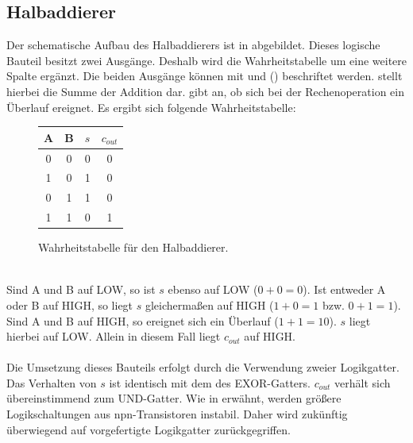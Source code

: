 \subsection{Halbaddierer}
Der schematische Aufbau des Halbaddierers ist in \cite{zimmermann1998binary} abgebildet. Dieses logische Bauteil besitzt zwei Ausgänge. Deshalb wird die Wahrheitstabelle um eine weitere Spalte ergänzt. Die beiden Ausgänge können mit  und  () beschriftet werden.  stellt hierbei die Summe der Addition dar.  gibt an, ob sich bei der Rechenoperation ein Überlauf ereignet. Es ergibt sich folgende Wahrheitstabelle:\\
\begin{figure}[h]
	\centering
	\hspace{1cm}
	\begin{tabular}{|c|c|c|c|}
		\hline
		\textbf{A} & \textbf{B} & \textbf{$s$} & \textbf{$c_{out}$} \\
		\hline
		0 & 0 & 0 & 0 \\
		1 & 0 & 1 & 0 \\
		0 & 1 & 1 & 0 \\
		1 & 1 & 0 & 1 \\
		\hline
	\end{tabular}
	\caption{Wahrheitstabelle für den Halbaddierer.}
\end{figure}\\
Sind A und B auf LOW, so ist $s$ ebenso auf LOW ($0+0=0$). Ist entweder A oder B auf HIGH, so liegt $s$ gleichermaßen auf HIGH ($1+0=1$ bzw. $0+1=1$). Sind A und B auf HIGH, so ereignet sich ein Überlauf ($1+1=10$). $s$ liegt hierbei auf LOW. Allein in diesem Fall liegt $c_{out}$ auf HIGH.\\\\
Die Umsetzung dieses Bauteils erfolgt durch die Verwendung zweier Logikgatter. Das Verhalten von $s$ ist identisch mit dem des EXOR-Gatters. $c_{out}$ verhält sich übereinstimmend zum UND-Gatter. Wie in  erwähnt, werden größere Logikschaltungen aus npn-Transistoren instabil. Daher wird zukünftig überwiegend auf vorgefertigte Logikgatter zurückgegriffen.\\
